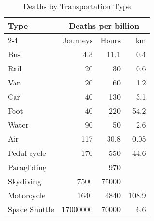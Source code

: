 \documentclass[preview]{standalone}
\newcommand{\ra}[1]{\renewcommand{\arraystretch}{#1}}
\begin{document}
\begin{table*}\centering
\caption*{Deaths by Transportation Type}
\ra{1.3}
\begin{tabular}{@{}lrrr@{}}
\toprule

\multirow{3}[3]{*}{Type} &\multicolumn{3}{c}{Deaths per billion} \\
\cmidrule(lr){2-4} &Journeys &Hours & km \\

\midrule
Bus & 4.3 & 11.1 & 0.4 \\
Rail & 20 & 30 & 0.6 \\
Van & 20 & 60 & 1.2 \\
Car & 40 & 130 & 3.1 \\
Foot & 40 & 220 & 54.2 \\
Water & 90 & 50 & 2.6 \\
Air & 117 & 30.8 & 0.05 \\
Pedal cycle & 170 & 550 & 44.6 \\
Paragliding &  & 970 &  \\
Skydiving & 7500 & 75000 &  \\
Motorcycle & 1640 & 4840 & 108.9 \\
Space Shuttle & 17000000 & 70000 & 6.6 \\

\bottomrule
\end{tabular}
\end{table*}
\end{document}
